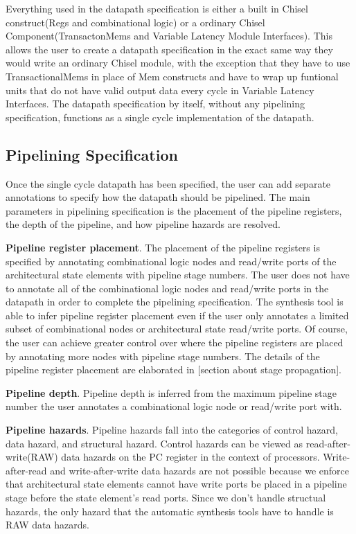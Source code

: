 Everything used in the datapath specification is either a built in Chisel construct(Regs and combinational logic) or a ordinary Chisel Component(TransactonMems and Variable Latency Module Interfaces). This allows the user to create a datapath specification in the exact same way they would write an ordinary Chisel module, with the exception that they have to use TransactionalMems in place of Mem constructs and have to wrap up funtional units that do not have valid output data every cycle in Variable Latency Interfaces. The datapath specification by itself, without any pipelining specification, functions as a single cycle implementation of the datapath.

\subsection {Pipelining Specification}
Once the single cycle datapath has been specified, the user can add separate annotations to specify how the datapath should be pipelined. The main parameters in pipelining specification is the placement of the pipeline registers, the depth of the pipeline, and how pipeline hazards are resolved.

{\bf Pipeline register placement}. The placement of the pipeline registers is specified by annotating combinational logic nodes and read/write ports of the architectural state elements with pipeline stage numbers. The user does not have to annotate all of the combinational logic nodes and read/write ports in the datapath in order to complete the pipelining specification. The synthesis tool is able to infer pipeline register placement even if the user only annotates a limited subset of combinational nodes or architectural state read/write ports. Of course, the user can achieve greater control over where the pipeline registers are placed by annotating more nodes with pipeline stage numbers. The details of the pipeline register placement are elaborated in [section about stage propagation]. 

{\bf Pipeline depth}. Pipeline depth is inferred from the maximum pipeline stage number the user annotates a combinational logic node or read/write port with. 

{\bf Pipeline hazards}. Pipeline hazards fall into the categories of control hazard, data hazard, and structural hazard. Control hazards can be viewed as read-after-write(RAW) data hazards on the PC register in the context of processors. Write-after-read and write-after-write data hazards are not possible because we enforce that architectural state elements cannot have write ports be placed in a pipeline stage before the state element's read ports. Since we don't handle structual hazards, the only hazard that the automatic synthesis tools have to handle is RAW data hazards.

